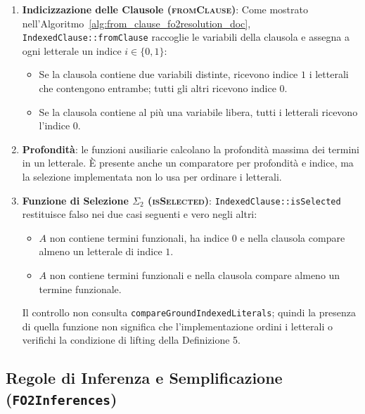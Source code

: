 \begin{enumerate}
    \item \textbf{Indicizzazione delle Clausole (\textsc{fromClause})}:
    Come mostrato nell'Algoritmo~\ref{alg:from_clause_fo2resolution_doc}, \texttt{IndexedClause::fromClause} raccoglie le variabili della clausola e assegna a ogni letterale un indice $i \in \{0,1\}$:
    \begin{itemize}
        \item Se la clausola contiene due variabili distinte, ricevono indice $1$ i letterali che contengono entrambe; tutti gli altri ricevono indice $0$.
        \item Se la clausola contiene al più una variabile libera, tutti i letterali ricevono l'indice $0$.
    \end{itemize}

    \item \textbf{Profondità}: le funzioni ausiliarie calcolano la profondità massima dei termini in un letterale. È presente anche un comparatore per profondità e indice, ma la selezione implementata non lo usa per ordinare i letterali.

    \item \textbf{Funzione di Selezione $\Sigma_2$ (\textsc{isSelected})}:
    \texttt{IndexedClause::isSelected} restituisce falso nei due casi seguenti e vero negli altri:
    \begin{itemize}
        \item $A$ non contiene termini funzionali, ha indice $0$ e nella clausola compare almeno un letterale di indice $1$.
        \item $A$ non contiene termini funzionali e nella clausola compare almeno un termine funzionale.
    \end{itemize}
    Il controllo non consulta \texttt{compareGroundIndexedLiterals}; quindi la presenza di quella funzione non significa che l'implementazione ordini i letterali o verifichi la condizione di lifting della Definizione 5.
\end{enumerate}



\subsection{Regole di Inferenza e Semplificazione (\texttt{FO2Inferences})}
\label{subsec:fo2inferences_impl}

